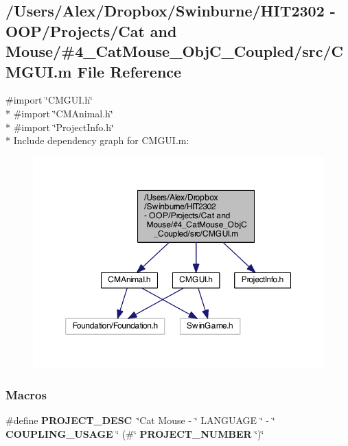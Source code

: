 \subsection{/\-Users/\-Alex/\-Dropbox/\-Swinburne/\-H\-I\-T2302 -\/ O\-O\-P/\-Projects/\-Cat and Mouse/\#4\-\_\-\-Cat\-Mouse\-\_\-\-Obj\-C\-\_\-\-Coupled/src/\-C\-M\-G\-U\-I.m File Reference}
\label{_c_m_g_u_i_8m}
{\ttfamily \#import \char`\"{}C\-M\-G\-U\-I.\-h\char`\"{}}\\*
{\ttfamily \#import \char`\"{}C\-M\-Animal.\-h\char`\"{}}\\*
{\ttfamily \#import \char`\"{}Project\-Info.\-h\char`\"{}}\\*
Include dependency graph for C\-M\-G\-U\-I.\-m\-:
\nopagebreak
\begin{figure}[H]
\begin{center}
\leavevmode
\includegraphics[width=350pt]{_c_m_g_u_i_8m__incl}
\end{center}
\end{figure}
\subsubsection*{Macros}
\begin{DoxyCompactItemize}
\item 
\#define {\bf P\-R\-O\-J\-E\-C\-T\-\_\-\-D\-E\-S\-C}~\char`\"{}Cat Mouse -\/ \char`\"{} L\-A\-N\-G\-U\-A\-G\-E \char`\"{} -\/ \char`\"{} {\bf C\-O\-U\-P\-L\-I\-N\-G\-\_\-\-U\-S\-A\-G\-E} \char`\"{} (\#\char`\"{} {\bf P\-R\-O\-J\-E\-C\-T\-\_\-\-N\-U\-M\-B\-E\-R} \char`\"{})\char`\"{}
\end{DoxyCompactItemize}


